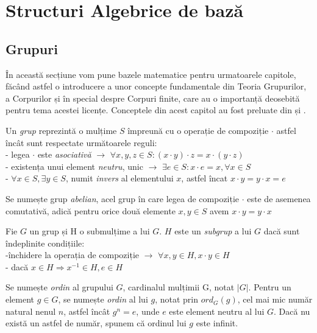 \let\textcircled=\pgftextcircled

\chapter{Structuri Algebrice de bază} 
\section{Grupuri}
\label{sec:sec01}
În această secțiune vom pune bazele matematice pentru urmatoarele capitole, făcând astfel o introducere a unor concepte fundamentale din Teoria Grupurilor, a Corpurilor și în special despre Corpuri finite, care au o importanță deosebită pentru tema acestei licențe. Conceptele din acest capitol au fost preluate din \cite{algebra1} și \cite{algebra2}.

\begin{dfn}
Un \textit{grup} reprezintă o mulțime $S$ împreună cu o operație de compoziție $\cdot$ astfel încât sunt respectate următoarele reguli:
\\ - legea $\cdot$ este \textit{asociativă} $\rightarrow$ $\forall x, y, z\in S: (x\cdot y)\cdot z = x\cdot (y \cdot z)$
\\ - existența unui element \textit{neutru}, unic $\rightarrow$ $\exists e\in S: x \cdot e = x, \forall x\in S$
\\ - $\forall x\in S, \exists y\in S$, numit \textit{invers} al elementului $x$, astfel încat $x\cdot y = y\cdot x = e$
\end{dfn}

\begin{dfn}
Se numește grup \textit{abelian}, acel grup în care legea de compoziție $\cdot$ este de asemenea comutativă, adică pentru orice două elemente
$x, y \in S$ avem $x \cdot y = y \cdot x$
\end{dfn}

\begin{dfn}
Fie $G$ un grup și H o submulțime a lui $G$. $H$ este un \textit{subgrup} a lui $G$ dacă sunt îndeplinite condițiile:
\\ -închidere la operația de compoziție $\rightarrow$ $\forall x, y \in H, x \cdot y \in H$
\\ - dacă $x \in H \Rightarrow x^{-1} \in H, e \in H$
\end{dfn}

\begin{dfn}
Se numește \textit{ordin} al grupului $G$, cardinalul mulțimii G, notat $|G|$. Pentru un element $g \in G$, se numește \textit{ordin} al lui $g$, notat prin $ord_G(g)$, cel mai
mic număr natural nenul $n$, astfel încât $g^n = e$, unde $e$ este element neutru al lui $G$. Dacă nu există un astfel de număr, spunem că ordinul lui $g$ este infinit.
\end{dfn}

